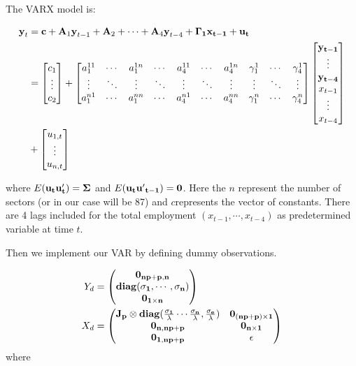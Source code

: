 \documentclass{monashthesis}
\begin{document}
The VARX model is:

\begin{align}
\textbf{y}_t&=\textbf{c}+\textbf{A}_1 \textbf{y}_{t-1}+\textbf{A}_2+\cdots+\textbf{A}_4\textbf{y}_{t-4}+\bf{\Gamma}_1\textbf{x}_{t-1}+\bf{u}_t\\
&=
\begin{bmatrix}
c_1\\
\vdots\\
c_2
\end{bmatrix}
+
\begin{bmatrix}
a_1^{11}&\cdots&a_1^{1n}&\cdots&a_4^{11}&\cdots&a_4^{1n}&\gamma_1^{1}&\cdots&\gamma_4^{1}\\
\vdots&\ddots&\vdots&\ddots&\vdots&\ddots&\vdots&\vdots&\ddots&\vdots\\
a_1^{n1}&\cdots&a_1^{nn}&\cdots&a_4^{n1}&\cdots&a_4^{nn}&\gamma_1^n&\cdots&\gamma_4^n\\
\end{bmatrix}
\begin{bmatrix}
\bf{y}_{t-1}\\
\vdots\\
\bf{y}_{t-4}\\
x_{t-1}\\
\vdots\\
x_{t-4}
\end{bmatrix}\\
&+
\begin{bmatrix}
u_{1,t}\\
\vdots\\
u_{n,t}
\end{bmatrix}\\
\end{align}

where \(E(\bf{u}_t\bf{u}'_t)=\bf{\Sigma}\) and \(E(\bf{u}_t\bf{u'}_{t-1})=0\). Here the \(n\) represent the number of sectors (or in our case will be 87) and \(c\)represents the vector of constants. There are 4 lags included for the total employment \((x_{t-1},\cdots,x_{t-4})\) as predetermined variable at time \(t\).

Then we implement our VAR by defining dummy observations.

\[
\begin{aligned}
Y_d&=
\begin{pmatrix}
\bf0_{np+p,n}\\
\bf diag(\bf{\sigma_1,\cdots,\sigma_n})\\
\bf0_{1\times n}
\end{pmatrix}\\
X_d&=
\begin{pmatrix}
\bf{J_p}\otimes diag(\frac{\sigma_1}{\lambda}\cdots\frac{\sigma_n}{\lambda},\frac{\sigma_e}{\lambda})&\bf0_{(np+p)\times1}\\
\bf 0_{n,np+p}&\bf 0_{n\times1}
\\
\bf 0_{1,np+p}&\bf \epsilon
\end{pmatrix}
\end{aligned}
\] where
\end{document}
